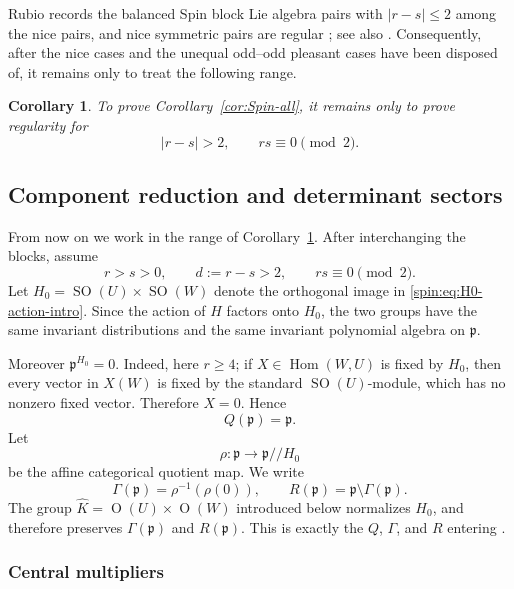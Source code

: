 \documentclass[11pt,reqno]{amsart}
\numberwithin{equation}{section}
\newtheorem{corollary}[theorem]{Corollary}
\theoremstyle{definition}
\theoremstyle{remark}
\newcommand{\SO}{\operatorname{SO}}
\newcommand{\Or}{\operatorname{O}}
\newcommand{\Hom}{\operatorname{Hom}}
\newcommand{\fp}{\mathfrak p}
\begin{document}
Rubio records the balanced Spin block Lie algebra pairs with $|r-s|\le2$
among the nice pairs, and nice symmetric pairs are regular
\cite[Lemmas~4.21--4.22 and Table~3]{Rubio}; see also
\cite{Sekiguchi,Aiz13}.  Consequently, after the nice cases and the
unequal odd--odd pleasant cases have been disposed of, it remains only to
treat the following range.

\begin{corollary}\label{spin:cor:remaining}
To prove Corollary~\ref{cor:Spin-all}, it remains only to prove regularity for
\[
  |r-s|>2,
  \qquad
  rs\equiv0\pmod2.
\]
\end{corollary}

\subsection{Component reduction and determinant sectors}\label{spin:sec:component}

From now on we work in the range of Corollary~\ref{spin:cor:remaining}.  After
interchanging the blocks, assume
\begin{equation}\label{spin:eq:standing}
  r>s>0,
  \qquad
  d:=r-s>2,
  \qquad
  rs\equiv0\pmod2.
\end{equation}
Let $H_0=\SO(U)\times\SO(W)$ denote the orthogonal image in
\eqref{spin:eq:H0-action-intro}.  Since the action of $H$ factors onto $H_0$, the
two groups have the same invariant distributions and the same invariant
polynomial algebra on $\fp$.

Moreover $\fp^{H_0}=0$.  Indeed, here $r\ge4$; if
$X\in\Hom(W,U)$ is fixed by $H_0$, then every vector in $X(W)$ is fixed by
the standard $\SO(U)$-module, which has no nonzero fixed vector.  Therefore
$X=0$.  Hence
\[
  Q(\fp)=\fp.
\]
Let
\[
  \rho:\fp\longrightarrow \fp/\!/H_0
\]
be the affine categorical quotient map.  We write
\begin{equation}\label{spin:eq:Gamma-R}
  \Gamma(\fp)=\rho^{-1}(\rho(0)),
  \qquad
  R(\fp)=\fp\setminus\Gamma(\fp).
\end{equation}
The group $\widehat K=\Or(U)\times\Or(W)$ introduced below normalizes
$H_0$, and therefore preserves $\Gamma(\fp)$ and $R(\fp)$.  This is exactly
the $Q$, $\Gamma$, and $R$ entering
\cite[Notation~2.3.10 and Definition~7.4.2]{AG09}.

\subsubsection{Central multipliers}
\end{document}
